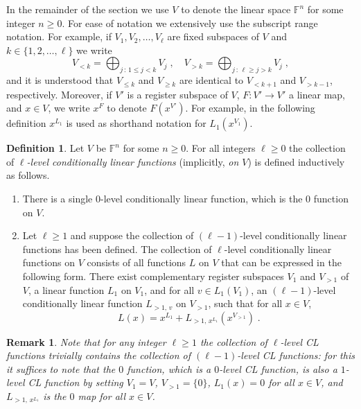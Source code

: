 \documentclass[11pt]{article}
\newtheorem{remark}[theorem]{Remark}
\theoremstyle{definition}
\newtheorem{definition}[theorem]{Definition}
\newcommand{\F}{\ensuremath{\mathbb{F}}}
\begin{document}
In the remainder of the section we use $V$ to denote the linear space $\F^n$ for
some integer $n \geq 0$.
For ease of notation we extensively use the subscript range notation.
For example, if $V_1, V_2, \ldots, V_\ell$ are fixed subspaces of $V$ and $k \in
\{1, 2, \ldots, \ell\}$ we write
\begin{equation*}
  V_{<k} = \bigoplus_{j\,:\,1 \le j<k} V_j\;,\quad
  V_{> k} = \bigoplus_{j\,:\, \ell\ge j > k} V_j\;,
\end{equation*}
and it is understood that $V_{\le k}$ and $V_{\ge k}$ are identical to
$V_{<k+1}$ and $V_{>k-1}$, respectively.
Moreover, if $V'$ is a register subspace of $V$, $F: V' \to V'$ a linear map,
and $x \in V$, we write $x^F$ to denote $F(x^{V'})$.
For example, in the following definition $x^{L_1}$ is used as shorthand notation
for $L_1(x^{V_1})$.

\begin{definition}
  \label{def:cl-func}
	Let $V$ be $\F^n$ for some $n\geq 0$.
  For all integers $\ell\geq 0$ the collection of \emph{$\ell$-level
    conditionally linear functions} (implicitly, \emph{on $V$}) is defined
  inductively as follows.
  \begin{enumerate}
  \item There is a single $0$-level conditionally linear function, which is the
    $0$ function on $V$.

  \item Let $\ell \geq 1$ and suppose the collection of $(\ell-1)$-level
    conditionally linear functions has been defined.
    The collection of $\ell$-level conditionally linear functions on $V$ consists
    of all functions $L$ on $V$ that can be expressed in the following form.
    There exist complementary register subspaces $V_1$ and $V_{>1}$ of $V$, a
    linear function $L_1$ on $V_1$, and for all $v \in L_1(V_1)$, an
    $(\ell-1)$-level conditionally linear function $L_{>1,\, v}$ on $V_{>1}$,
    such that for all $x\in V$,
    \begin{equation*}
      L(x) = x^{L_1} + L_{>1,\, x^{L_1}} (x^{V_{>1}})\;.
    \end{equation*}
  \end{enumerate}
\end{definition}

\begin{remark}
  \label{rk:higher-level}
  Note that for any integer $\ell\geq 1$ the collection of $\ell$-level CL
  functions trivially contains the collection of $(\ell-1)$-level CL functions:
  for this it suffices to note that the $0$ function, which is a $0$-level CL
  function, is also a $1$-level CL function by setting $V_1=V$, $V_{>1}= \{0\}$,
  $L_1(x)=0$ for all $x\in V$, and $L_{>1,\, x^{L_1}}$ is the $0$ map for all
  $x\in V$.
\end{remark}
\end{document}
